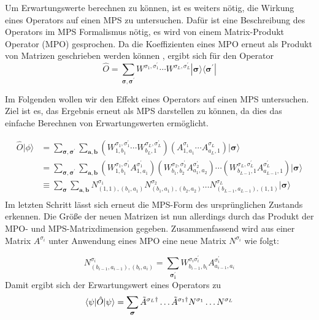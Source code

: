 \documentclass[10pt,a4paper]{report}
\begin{document}
Um Erwartungswerte berechnen zu können, ist es weiters nötig, die Wirkung eines Operators auf einen MPS zu untersuchen. Dafür ist eine Beschreibung des Operators im MPS Formalismus nötig, es wird von einem Matrix-Produkt Operator (MPO) gesprochen. Da die Koeffizienten eines MPO erneut als Produkt von Matrizen geschrieben werden können \cite{MPS-main}, ergibt sich für den Operator
\begin{equation}
\hat{O}=\sum_{\bm{\sigma},\bm{\sigma}^{\prime}}W^{\sigma_1,\sigma_1^{\prime}}\cdots W^{\sigma_L,\sigma_L^{\prime}} |\bm{\sigma}\rangle\langle\bm{\sigma}^{\prime}|
\end{equation}

Im Folgenden wollen wir den Effekt eines Operators auf einen MPS untersuchen. Ziel ist es, das Ergebnis erneut als MPS darstellen zu können, da dies das einfache Berechnen von Erwartungswerten ermöglicht.

\begin{equation}\label{MPO_MPS_equ}
\begin{split}
\hat{O}|\phi\rangle & = \sum_{\bm{\sigma},\bm{\sigma}^{\prime}}\sum_{\bm{a},\bm{b}}\left( W_{1,b_1}^{\sigma_1,\sigma_1^\prime}\cdots W_{b_L,1}^{\sigma_L,\sigma_L^\prime}\right) \left( A_{1,a_1}^{\sigma_1}\cdots A_{a_L,1}^{\sigma_L}\right) |\bm{\sigma}\rangle \\
& =\sum_{\bm{\sigma},\bm{\sigma}^{\prime}}\sum_{\bm{a},\bm{b}}\left( W_{1,b_1}^{\sigma_1,\sigma_1^\prime}A_{1,a_1}^{\sigma_1^\prime}\right)\left( W_{b_1,b_2}^{\sigma_2,\sigma_2^\prime}A_{a_1,a_2}^{\sigma_2^\prime}\right)\cdots\left( W_{b_{L-1},1}^{\sigma_L,\sigma_L^\prime}A_{a_{L-1},1}^{\sigma_L^\prime}\right) |\bm{\sigma}\rangle \\
&\equiv\sum_{\bm{\sigma}}\sum_{\bm{a},\bm{b}}N_{(1,1),(b_1,a_1)}^{\sigma_1}N_{(b_1,a_1),(b_2,a_2)}^{\sigma_2}\ldots N_{(b_{L-1},a_{L-1}),(1,1)}^{\sigma_L}|\bm{\sigma}\rangle \\
\end{split}
\end{equation}
Im letzten Schritt lässt sich erneut die MPS-Form des ursprünglichen Zustands erkennen. Die Größe der neuen Matrizen ist nun allerdings durch das Produkt der MPO- und MPS-Matrixdimension gegeben. Zusammenfassend wird aus einer Matrix $A^{\sigma_i}$ unter Anwendung eines MPO eine neue Matrix $N^{\sigma_i}$ wie folgt:

\begin{equation}
N_{(b_{i-1},a_{i-1}),(b_i,a_i)}^{\sigma_i}=\sum_{\bm{\sigma_i^\prime}}W_{b_{i-1},b_i}^{\sigma_i\sigma_i^\prime}A_{a_{i-1},a_i}^{\sigma_i^\prime}
\end{equation}
Damit ergibt sich der Erwartungswert eines Operators zu
\begin{equation}
\langle\psi|\hat{O}|\psi\rangle=\sum_{\bm{\sigma}}\tilde{A}^{\sigma_L \dagger}\ldots\tilde{A}^{\sigma_1 \dagger} N^{\sigma_1}\ldots N^{\sigma_L}\\
\end{equation}
\end{document}
